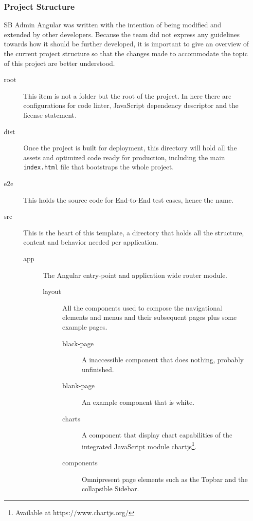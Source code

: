\subsubsection{Project Structure}
SB Admin Angular was written with the intention of being modified and extended by other developers. Because the team did not express any guidelines towards how it should be further developed, it is important to give an overview of the current project structure so that the changes made to accommodate the topic of this project are better understood.

\begin{description}
\item[root] This item is not a folder but the root of the project. In here there are configurations for code linter, JavaScript dependency descriptor and the license statement.
\item[dist] Once the project is built for deployment, this directory will hold all the assets and optimized code ready for production, including the main \texttt{index.html} file that bootstraps the whole project.
\item[e2e] This holds the source code for End-to-End test cases, hence the name.
\item[src] This is the heart of this template, a directory that holds all the structure, content and behavior needed per application. \leavevmode
  \begin{description}
  \item[app] The Angular entry-point and application wide router module. \leavevmode
    \begin{description}
    \item[layout] All the components used to compose the navigational elements and menus and their subsequent pages plus some example pages. \leavevmode
      \begin{description}
      \item[black-page] A inaccessible component that does nothing, probably unfinished.
      \item[blank-page] An example component that is white.
      \item[charts] A component that display chart capabilities of the integrated JavaScript module chartjs\footnote{Available at https://www.chartjs.org/}.
          \item[components] Omnipresent page elements such as the Topbar and the collapsible Sidebar.\leavevmode
        \begin{description}

\end{description}
\end{description}
\end{description}
\end{description}
\end{description}
